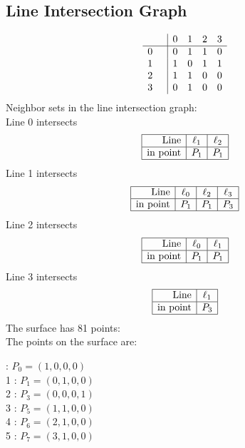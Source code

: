 \documentclass{article}
\begin{document}
{\subsection*{Line Intersection Graph}
{\arraycolsep=1pt
$$
\begin{array}{rr|*{4}r}
 &  & 0 & 1 & 2 & 3\\
\hline
0 &  & 0 & 1 & 1 & 0\\
1 &  & 1 & 0 & 1 & 1\\
2 &  & 1 & 1 & 0 & 0\\
3 &  & 0 & 1 & 0 & 0\\
\end{array}
$$
}%
Neighbor sets in the line intersection graph:\\
Line 0 intersects 
$$
\begin{array}{|r*{2}{|c}|}
\hline
\mbox{Line}  & \ell_{1} & \ell_{2}\\
\hline
\mbox{in point}  & P_{1} & P_{1}\\
\hline
\end{array}
$$
Line 1 intersects 
$$
\begin{array}{|r*{3}{|c}|}
\hline
\mbox{Line}  & \ell_{0} & \ell_{2} & \ell_{3}\\
\hline
\mbox{in point}  & P_{1} & P_{1} & P_{3}\\
\hline
\end{array}
$$
Line 2 intersects 
$$
\begin{array}{|r*{2}{|c}|}
\hline
\mbox{Line}  & \ell_{0} & \ell_{1}\\
\hline
\mbox{in point}  & P_{1} & P_{1}\\
\hline
\end{array}
$$
Line 3 intersects 
$$
\begin{array}{|r*{1}{|c}|}
\hline
\mbox{Line}  & \ell_{1}\\
\hline
\mbox{in point}  & P_{3}\\
\hline
\end{array}
$$
The surface has 81 points:\\
The points on the surface are:\\
\begin{multicols}{3}
 : $P_{0}=( 1, 0, 0, 0 )$\\
1 : $P_{1}=( 0, 1, 0, 0 )$\\
2 : $P_{3}=( 0, 0, 0, 1 )$\\
3 : $P_{5}=( 1, 1, 0, 0 )$\\
4 : $P_{6}=( 2, 1, 0, 0 )$\\
5 : $P_{7}=( 3, 1, 0, 0 )$\\

\end{multicols}}
\end{document}
